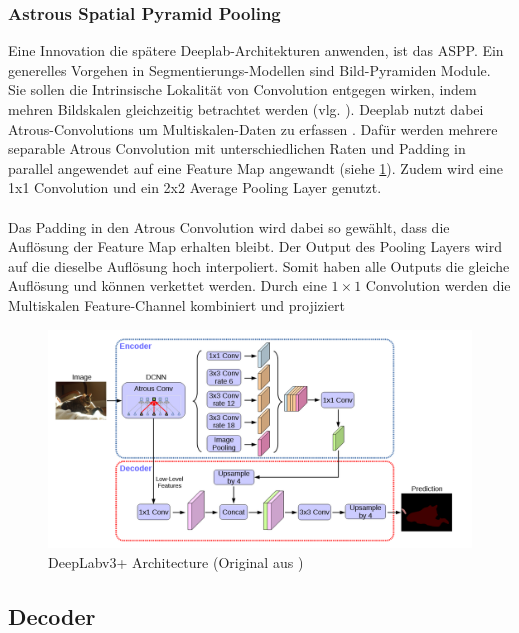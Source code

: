 \documentclass[12pt,DIV=15,BCOR=15mm,twoside,headsepline,abstract=true,listof=totoc,bibliography=totoc]{scrreprt}
\theoremstyle{remark}    %
\begin{document}
    \subsubsection{Astrous Spatial Pyramid Pooling}
    Eine Innovation die spätere Deeplab-Architekturen anwenden, ist das \ac{ASPP}. Ein generelles Vorgehen in Segmentierungs-Modellen sind
    Bild-Pyramiden Module. Sie sollen die Intrinsische Lokalität von Convolution entgegen wirken, indem mehren Bildskalen gleichzeitig betrachtet werden
    (vlg. \cite{csurka2023semanticimagesegmentationdecades}). 
    Deeplab nutzt dabei Atrous-Convolutions um Multiskalen-Daten zu erfassen \cite{chen2017rethinkingatrousconvolutionsemantic}. Dafür werden
    mehrere separable Atrous Convolution mit unterschiedlichen Raten und Padding in parallel angewendet auf eine Feature Map angewandt (siehe \ref{fig:deeplabv3plus}). 
    Zudem wird eine 1x1 Convolution und ein 2x2 Average Pooling Layer genutzt. \\\\
    Das Padding in den Atrous Convolution wird dabei so gewählt, dass die Auflösung der Feature Map erhalten bleibt.
    Der Output des Pooling Layers wird auf die dieselbe Auflösung hoch interpoliert. Somit haben alle Outputs 
    die gleiche Auflösung und können verkettet werden. Durch eine $1\times 1$ Convolution werden die Multiskalen Feature-Channel
    kombiniert und projiziert \cite{chen2017rethinkingatrousconvolutionsemantic}

    \begin{figure}[ht]
        \centering
        \includegraphics[width=0.9\linewidth]{pics/Arc.png}
        \caption{DeepLabv3+ Architecture (Original aus \cite{chen2018encoderdecoderatrousseparableconvolution})}
        \label{fig:deeplabv3plus}
    \end{figure}

    \subsection{Decoder} 
\end{document}
